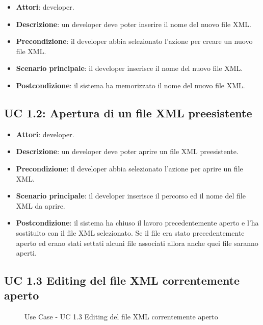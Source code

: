 		\begin{itemize}
			\item\textbf{Attori}: developer.
			\item\textbf{Descrizione}: un developer deve poter inserire il nome del nuovo file XML.
			\item\textbf{Precondizione}: il developer abbia selezionato l'azione per creare un nuovo file XML.
			\item\textbf{Scenario principale}: il developer inserisce il nome del nuovo file XML.
			\item\textbf{Postcondizione}: il sistema ha memorizzato il nome del nuovo file XML.
		\end{itemize}
		
	\subsection{UC 1.2: Apertura di un file XML preesistente}
		\label{subsec:XEUC1.2}
		
		\begin{itemize}
			\item\textbf{Attori}: developer.
			\item\textbf{Descrizione}: un developer deve poter aprire un file XML preesistente.
			\item\textbf{Precondizione}: il developer abbia selezionato l'azione per aprire un file XML.
			\item\textbf{Scenario principale}: il developer inserisce il percorso ed il nome del file XML da aprire.
			\item\textbf{Postcondizione}: il sistema ha chiuso il lavoro precedentemente aperto e l'ha sostituito con il file XML selezionato. Se il file era stato precedentemente aperto ed erano stati settati alcuni file associati allora anche quei file saranno aperti.
		\end{itemize}
		
	\subsection{UC 1.3 Editing del file XML correntemente aperto}
		\label{subsec:XEUC1.3}
		
		\begin{figure}[!h] 
			\centering 
			\caption{Use Case - UC 1.3 Editing del file XML correntemente aperto}
		\end{figure}
		

